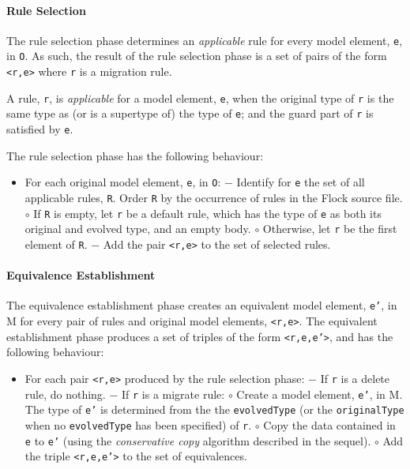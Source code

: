 \paragraph{Rule Selection}
The rule selection phase determines an \emph{applicable} rule for every model element, \texttt{e}, in \texttt{O}. As such, the result of the rule selection phase is a set of pairs of the form \texttt{<r,e>} where \texttt{r} is a migration rule.

A rule, \texttt{r}, is \emph{applicable} for a model element, \texttt{e}, when the original type of \texttt{r} is the same type as (or is a supertype of) the type of \texttt{e}; and the guard part of \texttt{r} is satisfied by \texttt{e}.

The rule selection phase has the following behaviour:

\begin{itemize}
	\item For each original model element, \texttt{e}, in \texttt{O}:
	\subitem $-$ Identify for \texttt{e} the set of all applicable rules, \texttt{R}. Order \texttt{R} by the occurrence of rules in the Flock source file.
	\subsubitem $\circ$ If \texttt{R} is empty, let \texttt{r} be a default rule, which has the type of \texttt{e} as both its original and evolved type, and an empty body.
	\subsubitem $\circ$ Otherwise, let \texttt{r} be the first element of \texttt{R}.
	\subitem $-$ Add the pair \texttt{<r,e>} to the set of selected rules.
\end{itemize}


\paragraph{Equivalence Establishment}
The equivalence establishment phase creates an equivalent model element, \texttt{e'}, in M for every pair of rules and original model elements, \texttt{<r,e>}. The equivalent establishment phase produces a set of triples of the form \texttt{<r,e,e'>}, and has the following behaviour:

\begin{itemize}
	\item For each pair \texttt{<r,e>} produced by the rule selection phase:
	\subitem $-$ If \texttt{r} is a delete rule, do nothing.
	\subitem $-$ If \texttt{r} is a migrate rule:
	\subsubitem $\circ$ Create a model element, \texttt{e'}, in M. The type of \texttt{e'} is determined from the the \texttt{evolvedType} (or the \texttt{originalType} when no \texttt{evolvedType} has been specified) of \texttt{r}.
	\subsubitem $\circ$ Copy the data contained in \texttt{e} to \texttt{e'} (using the \emph{conservative copy} algorithm described in the sequel).
	\subsubitem $\circ$ Add the triple \texttt{<r,e,e'>} to the set of equivalences.
\end{itemize}
	
